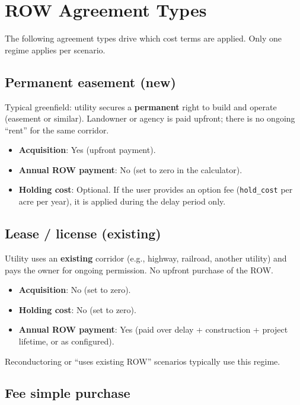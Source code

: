 \documentclass[ctcc_full_documentation.tex]{subfiles}
\begin{document}
\section{ROW Agreement Types}

The following agreement types drive which cost terms are applied. Only one regime applies per scenario.

\subsection{Permanent easement (new)}

Typical greenfield: utility secures a \textbf{permanent} right to build and operate (easement or similar). Landowner or agency is paid upfront; there is no ongoing ``rent'' for the same corridor.

\begin{itemize}
    \item \textbf{Acquisition}: Yes (upfront payment).
    \item \textbf{Annual ROW payment}: No (set to zero in the calculator).
    \item \textbf{Holding cost}: Optional. If the user provides an option fee (\texttt{hold\_cost} per acre per year), it is applied during the delay period only.
\end{itemize}

\subsection{Lease / license (existing)}

Utility uses an \textbf{existing} corridor (e.g., highway, railroad, another utility) and pays the owner for ongoing permission. No upfront purchase of the ROW.

\begin{itemize}
    \item \textbf{Acquisition}: No (set to zero).
    \item \textbf{Holding cost}: No (set to zero).
    \item \textbf{Annual ROW payment}: Yes (paid over delay + construction + project lifetime, or as configured).
\end{itemize}

Reconductoring or ``uses existing ROW'' scenarios typically use this regime.

\subsection{Fee simple purchase}
\end{document}
